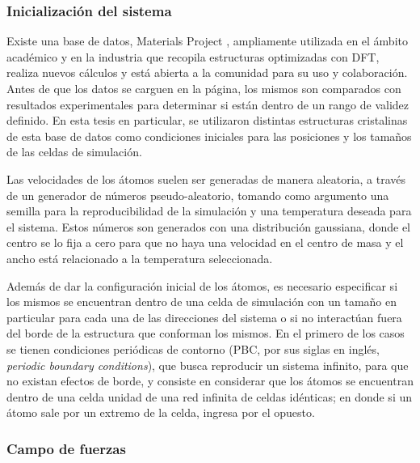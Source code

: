 \subsubsection{Inicialización del sistema}

Existe una base de datos, Materials Project \cite{materials_project}, 
ampliamente utilizada en el ámbito académico y en la industria que 
recopila estructuras optimizadas con DFT, realiza nuevos cálculos y 
está abierta a la comunidad para su uso y colaboración. Antes de que 
los datos se carguen en la página, los mismos son comparados con resultados 
experimentales para determinar si están dentro de un rango de validez definido. 
En esta tesis en particular, se utilizaron distintas estructuras cristalinas de 
esta base de datos como condiciones iniciales para las posiciones y los tamaños 
de las celdas de simulación.

Las velocidades de los átomos suelen ser generadas de manera aleatoria, a través
de un generador de números pseudo-aleatorio, tomando como argumento una semilla 
para la reproducibilidad de la simulación y una temperatura deseada para el
sistema. Estos números son generados con una distribución gaussiana, donde el 
centro se lo fija a cero para que no haya una velocidad en el centro de masa y 
el ancho está relacionado a la temperatura seleccionada.

Además de dar la configuración inicial de los átomos, es necesario especificar si
los mismos se encuentran dentro de una celda de simulación con un tamaño en
particular para cada una de las direcciones del sistema o si no interactúan fuera
del borde de la estructura que conforman los mismos. En el primero de los casos
se tienen condiciones periódicas de contorno (PBC, por sus siglas en inglés, 
\textit{periodic boundary conditions}), que busca reproducir un sistema infinito,
para que no existan efectos de borde, y consiste en considerar que los átomos se 
encuentran dentro de una celda unidad de una red infinita de celdas idénticas; en
donde si un átomo sale por un extremo de la celda, ingresa por el opuesto. %


\subsubsection{Campo de fuerzas}

